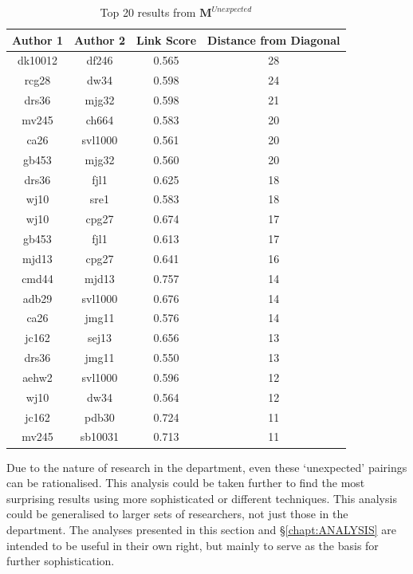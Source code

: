 \begin{table}[H]
\centering
\caption{Top 20 results from $\mathbf{M}^{Unexpected}$}
\label{tab:unexp}
\begin{tabular}{||c|c|c|c||}
\hline
Author 1 & Author 2 & Link Score & Distance from Diagonal\\
\hline
dk10012 & df246 & 0.565 & 28 \\ 
rcg28 & dw34 & 0.598 & 24 \\ 
drs36 & mjg32 & 0.598 & 21 \\ 
mv245 & ch664 & 0.583 & 20 \\
ca26 & svl1000 & 0.561 & 20 \\ 
gb453 & mjg32 & 0.560 & 20 \\ 
drs36 & fjl1 & 0.625 & 18 \\ 
wj10 & sre1 & 0.583 & 18 \\ 
wj10 & cpg27 & 0.674 & 17 \\ 
gb453 & fjl1 & 0.613 & 17 \\ 
mjd13 & cpg27 & 0.641 & 16 \\ 
cmd44 & mjd13 & 0.757 & 14 \\
adb29 & svl1000 & 0.676 & 14 \\ 
ca26 & jmg11 & 0.576 & 14 \\ 
jc162 & sej13 & 0.656 & 13 \\ 
drs36 & jmg11 & 0.550 & 13 \\
aehw2 & svl1000 & 0.596 & 12 \\ 
wj10 & dw34 & 0.564 & 12 \\ 
jc162 & pdb30 & 0.724 & 11 \\ 
mv245 & sb10031 & 0.713 & 11 \\ 
\hline
\end{tabular}
\end{table}
Due to the nature of research in the department, even these `unexpected' pairings can be rationalised. This analysis could be taken further to find the most surprising results using more sophisticated or different techniques. This analysis could be generalised to larger sets of researchers, not just those in the department. The analyses presented in this section and \S\ref{chapt:ANALYSIS} are intended to be useful in their own right, but mainly to serve as the basis for further sophistication.
